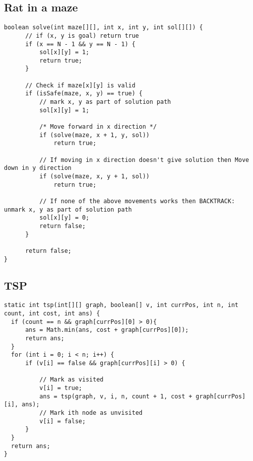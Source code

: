\subsection*{Rat in a maze}
\begin{verbatim}
boolean solve(int maze[][], int x, int y, int sol[][]) {
      // if (x, y is goal) return true 
      if (x == N - 1 && y == N - 1) {
          sol[x][y] = 1;
          return true;
      }

      // Check if maze[x][y] is valid 
      if (isSafe(maze, x, y) == true) {
          // mark x, y as part of solution path 
          sol[x][y] = 1;

          /* Move forward in x direction */
          if (solve(maze, x + 1, y, sol))
              return true; 

          // If moving in x direction doesn't give solution then Move down in y direction 
          if (solve(maze, x, y + 1, sol))
              return true; 

          // If none of the above movements works then BACKTRACK: unmark x, y as part of solution path 
          sol[x][y] = 0;
          return false;
      }

      return false;
}
\end{verbatim}
\subsection*{TSP}
\begin{verbatim}
static int tsp(int[][] graph, boolean[] v, int currPos, int n, int count, int cost, int ans) { 
  if (count == n && graph[currPos][0] > 0){ 
      ans = Math.min(ans, cost + graph[currPos][0]); 
      return ans; 
  } 
  for (int i = 0; i < n; i++) { 
      if (v[i] == false && graph[currPos][i] > 0) { 

          // Mark as visited 
          v[i] = true; 
          ans = tsp(graph, v, i, n, count + 1, cost + graph[currPos][i], ans); 
          // Mark ith node as unvisited 
          v[i] = false; 
      } 
  } 
  return ans; 
} 
\end{verbatim}